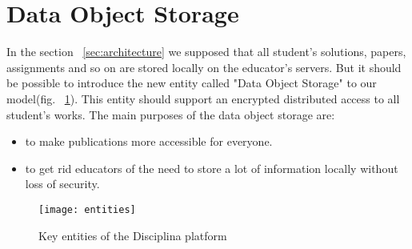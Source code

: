 \appendix
\section{Data Object Storage}

In the section ~\ref{sec:architecture} we supposed that all student's solutions, papers, assignments and so on are stored locally on the educator's servers. But it should be possible to introduce the new entity called "Data Object Storage" to our model(fig. ~\ref{fig:entities}). This entity should support an encrypted distributed access to all student's works. The main purposes of the data object storage are:
\begin{itemize}
\item to make publications more accessible for everyone.
\item to get rid educators of the need to store a lot of information locally without loss of security.
\end{itemize}

\begin{figure}[ht]
\centering
\texttt{[image: entities]}
\caption{Key entities of the Disciplina platform}
\label{fig:entities}
\end{figure}
